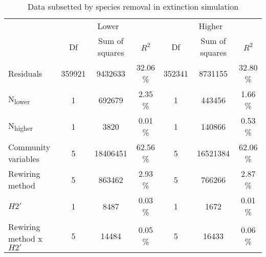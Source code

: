 \documentclass[12pt,a4paper]{article}
\begin{document}
\begin{table}[H]
\begin{subtable}{\linewidth}
\caption{Data subsetted by species removal in extinction simulation}
\label{tab:anova_lo_hi}
\begin{tabularx}{\linewidth}{@{} X *6{c} @{}}
\toprule
  & \multicolumn{3}{c}{Lower} & \multicolumn{3}{c}{Higher} \\ \cmidrule(l){2-4} \cmidrule(l){5-7} 
  						& Df 	& Sum of squares	& $R^2$ 		& Df 	& Sum of squares 	& $R^2$  \\ \midrule
Residuals 				& 359921 & 9432633 		& 32.06 \% 	& 352341	& 8731155 			& 32.80 \%\\ 
N\textsubscript{lower} 	& 1 		& 692679 		& 2.35 \% 	& 1 		& 443456 			& 1.66 \%\\
N\textsubscript{higher} 	& 1 		& 3820 			& 0.01 \% 	& 1 		& 140866 			& 0.53 \%\\
Community variables 		& 5 		& 18406451 		& 62.56 \% 	& 5 		& 16521384 			& 62.06 \%\\
Rewiring method 			& 5 		& 863462			& 2.93 \% 	& 5 		& 766266				& 2.87 \%\\ 
$H2'$ 					& 1 		& 8487 			& 0.03 \% 	& 1 		& 1672 				& 0.01 \%\\
Rewiring method x $H2'$ 	& 5 		& 14484 			& 0.05 \% 	& 5 		& 16433				& 0.06 \%\\ \bottomrule
\end{tabularx}
\end{subtable}
\medskip
\end{table}


\end{document}
